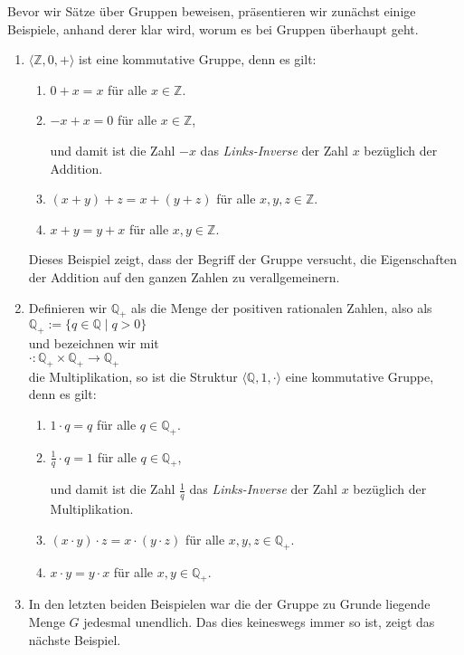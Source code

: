 \examples
Bevor wir S\"{a}tze \"{u}ber Gruppen beweisen, pr\"{a}sentieren wir zun\"{a}chst einige Beispiele, anhand
derer klar wird, worum es bei Gruppen \"{u}berhaupt geht.
\begin{enumerate}
\item $\langle \mathbb{Z}, 0, + \rangle$ ist eine kommutative Gruppe, denn es gilt:
      \begin{enumerate}
      \item $0 + x = x$ \quad f\"{u}r alle $x \in \mathbb{Z}$.
      \item $-x + x = 0$ \quad f\"{u}r alle $x \in \mathbb{Z}$,
        
            und damit ist die Zahl $-x$ das \emph{Links-Inverse} der Zahl $x$ bez\"{u}glich
            der Addition.
      \item $(x + y) + z = x + (y + z)$ \quad f\"{u}r alle $x,y,z \in \mathbb{Z}$.
      \item $x + y = y + x$ \quad f\"{u}r alle $x,y \in \mathbb{Z}$.
      \end{enumerate}
      Dieses Beispiel zeigt, dass der Begriff der Gruppe versucht, die Eigenschaften der
      Addition auf den ganzen Zahlen zu verallgemeinern.
\item Definieren wir $\mathbb{Q}_+$ als die Menge der positiven rationalen Zahlen, also als
      \\[0.2cm]
      \hspace*{1.3cm}
      $\mathbb{Q}_+ := \{ q \in \mathbb{Q} \mid q > 0 \}$
      \\[0.2cm]
      und bezeichnen wir mit
      \\[0.2cm]
      \hspace*{1.3cm}
      $\cdot : \mathbb{Q}_+ \times \mathbb{Q}_+ \rightarrow \mathbb{Q}_+$
      \\[0.2cm]
      die Multiplikation, so ist die Struktur $\langle \mathbb{Q}, 1, \cdot \rangle$ eine
      kommutative Gruppe, denn es gilt: 
      \begin{enumerate}
      \item $1 \cdot q = q$ \quad f\"{u}r alle $q \in \mathbb{Q}_+$.
      \item $\frac{1}{q} \cdot q = 1$ \quad f\"{u}r alle $q \in \mathbb{Q}_+$,
        
            und damit ist die Zahl $\frac{1}{q}$ das \emph{Links-Inverse} der Zahl $x$ bez\"{u}glich der
            Multiplikation.
      \item $(x \cdot y) \cdot z = x \cdot (y \cdot z)$ \quad f\"{u}r alle $x,y,z \in \mathbb{Q}_+$.
      \item $x \cdot y = y \cdot x$ \quad f\"{u}r alle $x,y \in \mathbb{Q}_+$.
      \end{enumerate}
\item In den letzten beiden Beispielen war die der Gruppe zu Grunde liegende Menge $G$
      jedesmal unendlich.  Das dies keineswegs immer so ist, zeigt das n\"{a}chste Beispiel.


\end{enumerate}
